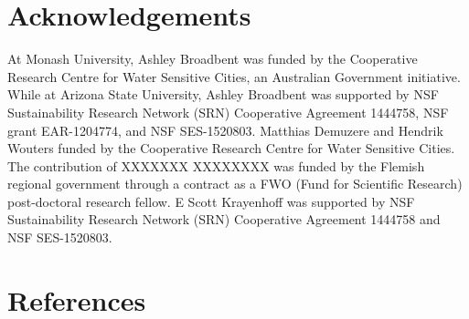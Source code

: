 \documentclass[final,3p,times,authoryear]{elsarticle}
\begin{document}
\printglossary[title={List of Symbols}]

\section*{Acknowledgements}
At Monash University, Ashley Broadbent was funded by the Cooperative Research Centre for Water Sensitive Cities, an Australian Government initiative. While at Arizona State University, Ashley Broadbent was supported by NSF Sustainability Research Network (SRN) Cooperative Agreement 1444758,  NSF grant EAR-1204774, and NSF SES-1520803. Matthias Demuzere and Hendrik Wouters funded by the Cooperative Research Centre for Water Sensitive Cities. The contribution of XXXXXXX XXXXXXXX was funded by the Flemish regional government through a contract as a FWO (Fund for Scientific Research) post-doctoral research fellow. E Scott Krayenhoff  was supported by NSF Sustainability Research Network (SRN) Cooperative Agreement 1444758 and NSF SES-1520803. 

\section*{References}\label{sec:ref}
   
  







\appendix
\setcounter{table}{0}
\renewcommand{\thetable}{A\arabic{table}}



\section{}\label{sec:app}  
\end{document}
